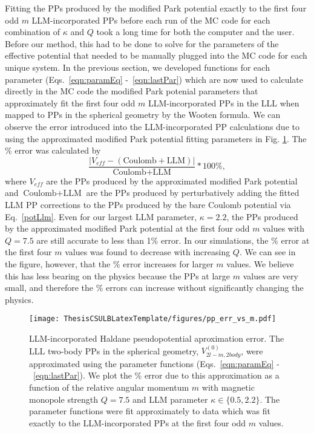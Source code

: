     Fitting the PPs produced by the modified Park potential exactly to the first four odd $m$ LLM-incorporated PPs before each run of the MC code for each combination of $\kappa$ and $Q$ took a long time for both the computer and the user. Before our method, this had to be done to solve for the parameters of the effective potential that needed to be manually plugged into the MC code for each unique system. In the previous section, we developed functions for each parameter (Eqs.~\ref{eqn:paramEq} -~\ref{eqn:lastPar}) which are now used to calculate directly in the MC code the modified Park potenial parameters that approximately fit the first four odd $m$ LLM-incorporated PPs in the LLL when mapped to PPs in the spherical geometry by the Wooten formula. We can observe the error introduced into the LLM-incorporated PP calculations due to using the approximated modified Park potential fitting parameters in Fig. \ref{fig:pp_err_vs_m}. The \% error was calculated by
    \begin{equation}\label{eq:perc_err}
    \frac{|V_{eff}-(\text{Coulomb}+\text{LLM})|}{\text{Coulomb}+\text{LLM}}*100\%,
    \end{equation}
    where $V_{eff}$ are the PPs produced by the approximated modified Park potential and $\text{Coulomb}+\text{LLM}$ are the PPs produced by perturbatively adding the fitted LLM PP corrections to the PPs produced by the bare Coulomb potential via Eq.~\ref{potLlm}. Even for our largest LLM parameter, $\kappa=2.2$, the PPs produced by the approximated modified Park potential at the first four odd $m$ values with $Q=7.5$ are still accurate to less than 1\% error. In our simulations, the \% error at the first four $m$ values was found to decrease with increasing $Q$. We can see in the figure, however, that the \% error increases for larger $m$ values. We believe this has less bearing on the physics because the PPs at large $m$ values are very small, and therefore the \% errors can increase without significantly changing the physics.
    
    \begin{figure}[h]
    \begin{center}
    \texttt{[image: ThesisCSULBLatexTemplate/figures/pp\_err\_vs\_m.pdf]}
    \caption[LLM-incorporated Haldane pseudopotential aproximation error.]{LLM-incorporated Haldane pseudopotential aproximation error. The LLL two-body PPs in the spherical geometry, $V^{(0)}_{2l-m,2body}$, were approximated using the parameter functions (Eqs.~\ref{eqn:paramEq} -~\ref{eqn:lastPar}). We plot the \% error due to this approximation as a function of the relative angular momentum $m$ with magnetic monopole strength $Q=7.5$ and LLM parameter $\kappa\in\{0.5,2.2\}$. The parameter functions were fit approximately to data which was fit exactly to the LLM-incorporated PPs at the first four odd $m$ values.}
    \label{fig:pp_err_vs_m} 
    \end{center}
    \end{figure}
    
